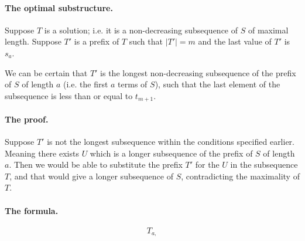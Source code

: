 \documentclass{article}
\begin{document}
\paragraph{The optimal substructure.} Suppose \(T\) is a solution; i.e. it is a non-decreasing subsequence of \(S\) of maximal length. Suppose \(T'\) is a prefix of \(T\) such that \(|T'| = m\) and the last value of \(T'\) is \(s_a\).

We can be certain that \(T'\) is the longest non-decreasing subsequence of the prefix of \(S\) of length \(a\) (i.e. the first \(a\) terms of \(S\)), such that the last element of the subsequence is less than or equal to \(t_{m+1}\).

\paragraph{The proof.} Suppose \(T'\) is not the longest subsequence within the conditions specified earlier. Meaning there exists \(U\) which is a longer subsequence of the prefix of \(S\) of length \(a\). Then we would be able to substitute the prefix \(T'\) for the \(U\) in the subsequence \(T\), and that would give a longer subsequence of \(S\), contradicting the maximality of \(T\).

\paragraph{The formula.}

\begin{equation*}
	T_{a,}
\end{equation*}
\end{document}
